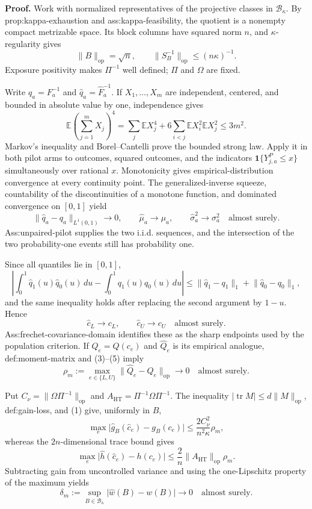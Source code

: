 \textbf{Proof.}
Work with normalized representatives of the projective classes in \(\mathcal B_\kappa\).  By prop:kappa-exhaustion and ass:kappa-feasibility, the quotient is a nonempty compact metrizable space.  Its block columns have squared norm \(n\), and \(\kappa\)-regularity gives
\[
 \lVert B\rVert_{\mathrm{op}}=\sqrt n,
 \qquad
 \lVert S_B^{-1}\rVert_{\mathrm{op}}\le(n\kappa)^{-1}.
 \tag{1}
\]
Exposure positivity makes \(\Pi^{-1}\) well defined; \(\Pi\) and \(\Omega\) are fixed.

Write \(q_a=F_a^{-1}\) and \(\widehat q_a=\widehat F_a^{-1}\).  If \(X_1,\ldots,X_m\) are independent, centered, and bounded in absolute value by one, independence gives
\[
 \mathbb E\!\left(\sum_{j=1}^mX_j\right)^4
 =\sum_j\mathbb EX_j^4+6\sum_{i<j}\mathbb EX_i^2\mathbb EX_j^2
 \le3m^2.
 \tag{2}
\]
Markov's inequality and Borel--Cantelli prove the bounded strong law.  Apply it in both pilot arms to outcomes, squared outcomes, and the indicators \(\mathbf1\{Y^P_{j,a}\le x\}\) simultaneously over rational \(x\).  Monotonicity gives empirical-distribution convergence at every continuity point.  The generalized-inverse squeeze, countability of the discontinuities of a monotone function, and dominated convergence on \([0,1]\) yield
\[
 \lVert\widehat q_a-q_a\rVert_{L^1(0,1)}\longrightarrow0,
 \qquad
 \widehat\mu_a\longrightarrow\mu_a,
 \qquad
 \widehat\sigma_a^2\longrightarrow\sigma_a^2
 \quad\text{almost surely}.
 \tag{3}
\]
Ass:unpaired-pilot supplies the two i.i.d. sequences, and the intersection of the two probability-one events still has probability one.

Since all quantiles lie in \([0,1]\),
\[
 \left|\int_0^1\widehat q_1(u)\widehat q_0(u)\,du
 -\int_0^1q_1(u)q_0(u)\,du\right|
 \le\lVert\widehat q_1-q_1\rVert_1+\lVert\widehat q_0-q_0\rVert_1,
 \tag{4}
\]
and the same inequality holds after replacing the second argument by \(1-u\).  Hence
\[
 \widehat c_L\longrightarrow c_L,
 \qquad \widehat c_U\longrightarrow c_U
 \quad\text{almost surely}.
 \tag{5}
\]
Ass:frechet-covariance-domain identifies these as the sharp endpoints used by the population criterion.  If \(Q_e=Q(c_e)\) and \(\widehat Q_e\) is its empirical analogue, def:moment-matrix and (3)--(5) imply
\[
 \rho_m:=\max_{e\in\{L,U\}}
 \lVert\widehat Q_e-Q_e\rVert_{\mathrm{op}}\longrightarrow0
 \quad\text{almost surely}.
 \tag{6}
\]

Put \(C_\nu=\lVert\Omega\Pi^{-1}\rVert_{\mathrm{op}}\) and \(A_{\mathrm{HT}}=\Pi^{-1}\Omega\Pi^{-1}\).  The inequality \(\lvert\operatorname{tr}M\rvert\le d\lVert M\rVert_{\mathrm{op}}\), def:gain-loss, and (1) give, uniformly in \(B\),
\[
 \max_e\lvert\widehat g_B(\widehat c_e)-g_B(c_e)\rvert
 \le\frac{2C_\nu^2}{n^2\kappa}\rho_m,
 \tag{7}
\]
whereas the \(2n\)-dimensional trace bound gives
\[
 \max_e\lvert\widehat h(\widehat c_e)-h(c_e)\rvert
 \le\frac2n\lVert A_{\mathrm{HT}}\rVert_{\mathrm{op}}\rho_m.
 \tag{8}
\]
Subtracting gain from uncontrolled variance and using the one-Lipschitz property of the maximum yields
\[
 \delta_m:=\sup_{B\in\mathcal B_\kappa}
 \lvert\widehat w(B)-w(B)\rvert\longrightarrow0
 \quad\text{almost surely}.
 \tag{9}
\]

